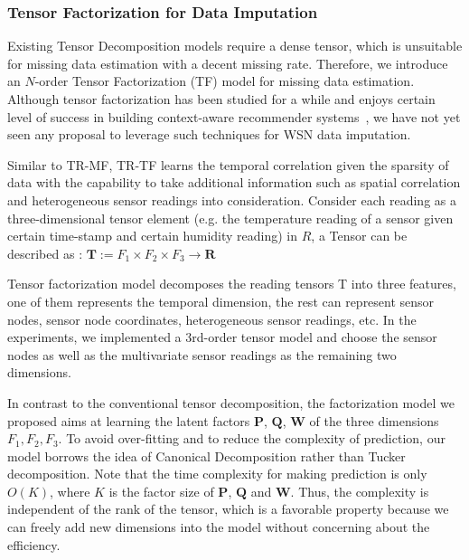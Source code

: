 \subsubsection{Tensor Factorization for Data Imputation} \label{sec:tfmissing}

Existing Tensor Decomposition models require a dense tensor, which is unsuitable for missing data estimation with a decent missing rate. 
Therefore, we introduce an $N$-order Tensor Factorization (TF) model for missing data estimation. Although tensor factorization has been studied for a while and enjoys certain level of success in building context-aware recommender systems~\cite{karatzoglou2010multiverse,rendle2010pairwise}, we have not yet seen any proposal to leverage such techniques for WSN data imputation.

Similar to TR-MF, TR-TF learns the temporal correlation given the sparsity of data with the capability to take additional information such as spatial correlation and heterogeneous sensor readings into consideration.
Consider each reading as a three-dimensional tensor element (e.g. the temperature reading of a sensor given certain time-stamp and certain humidity reading) in $R$, a Tensor can be described as :
$\mathbf{T} := F_1 \times  F_2 \times F_3 \rightarrow \mathbf{R} $

Tensor factorization model decomposes the reading tensors T into three features, one of them represents the temporal dimension, the rest can represent sensor nodes, sensor node coordinates, heterogeneous sensor readings, etc. In the experiments, we implemented a 3rd-order tensor model and choose the sensor nodes as well as the multivariate sensor readings as the remaining two dimensions.

In contrast to the conventional tensor decomposition, the factorization model we proposed aims at learning the latent factors $\mathbf{P}$,  $\mathbf{Q}$, $\mathbf{W}$ of the three dimensions $F_1, F_2, F_3$.
To avoid over-fitting and to reduce the complexity of prediction, our model borrows the idea of Canonical Decomposition rather than Tucker decomposition. Note that the time complexity for making prediction is only $O(K)$, where $K$ is the factor size of $\mathbf{P}$, $\mathbf{Q}$ and $\mathbf{W}$. Thus, the complexity is independent of the rank of the tensor, which is a favorable property because we can freely add new dimensions into the model without concerning about the efficiency.

